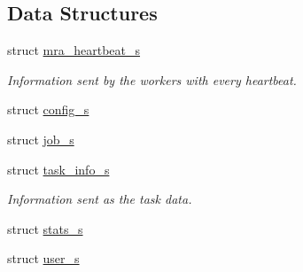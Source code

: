 \subsection*{\-Data \-Structures}
\begin{DoxyCompactItemize}
\item 
struct \hyperlink{structmra__heartbeat__s}{mra\-\_\-heartbeat\-\_\-s}
\begin{DoxyCompactList}\small\item\em \-Information sent by the workers with every heartbeat. \end{DoxyCompactList}\item 
struct \hyperlink{structconfig__s}{config\-\_\-s}
\item 
struct \hyperlink{structjob__s}{job\-\_\-s}
\item 
struct \hyperlink{structtask__info__s}{task\-\_\-info\-\_\-s}
\begin{DoxyCompactList}\small\item\em \-Information sent as the task data. \end{DoxyCompactList}\item 
struct \hyperlink{structstats__s}{stats\-\_\-s}
\item 
struct \hyperlink{structuser__s}{user\-\_\-s}
\end{DoxyCompactItemize}
